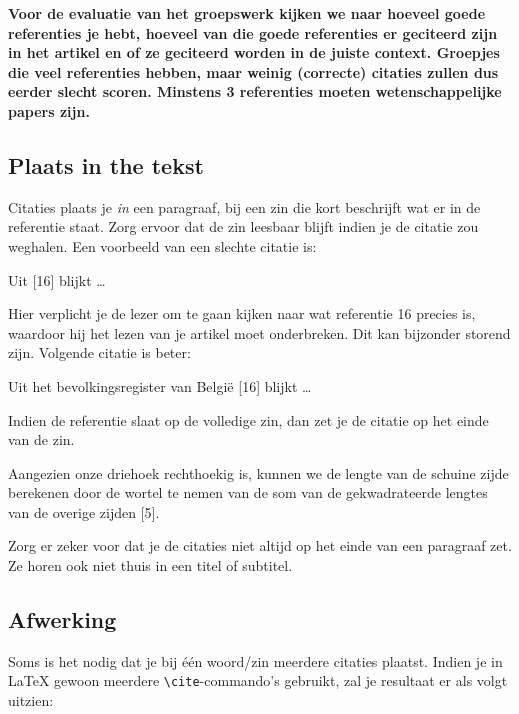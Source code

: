 \documentclass[a4paper]{article}
\begin{document}
\textbf{Voor de evaluatie van het groepswerk kijken we naar hoeveel goede referenties je hebt, hoeveel van die goede referenties er geciteerd zijn in het artikel en of ze geciteerd worden in de juiste context.
Groepjes die veel referenties hebben, maar weinig (correcte) citaties zullen dus eerder slecht scoren.
Minstens 3 referenties moeten wetenschappelijke papers zijn.}


\subsection{Plaats in the tekst}

Citaties plaats je \emph{in} een paragraaf, bij een zin die kort beschrijft wat er in de referentie staat.
Zorg ervoor dat de zin leesbaar blijft indien je de citatie zou weghalen.
Een voorbeeld van een slechte citatie is:

\begin{displayquote}
{\color{red} Uit [16] blijkt \ldots}
\end{displayquote}

Hier verplicht je de lezer om te gaan kijken naar wat referentie 16 precies is, waardoor hij het lezen van je artikel moet onderbreken.
Dit kan bijzonder storend zijn.
Volgende citatie is beter:

\begin{displayquote}
{\color{darkgreen} Uit het bevolkingsregister van Belgi\"e [16] blijkt \ldots}
\end{displayquote}

Indien de referentie slaat op de volledige zin, dan zet je de citatie op het einde van de zin.

\begin{displayquote}
{\color{darkgreen} Aangezien onze driehoek rechthoekig is, kunnen we de lengte van de schuine zijde berekenen door de wortel te nemen van de som van de gekwadrateerde lengtes van de overige zijden [5].}
\end{displayquote}

Zorg er zeker voor dat je de citaties niet altijd op het einde van een paragraaf zet.
Ze horen ook niet thuis in een titel of subtitel.


\subsection{Afwerking}

Soms is het nodig dat je bij \'e\'en woord/zin meerdere citaties plaatst.
Indien je in \LaTeX{} gewoon meerdere \texttt{\textbackslash{}cite}-commando's gebruikt, zal je resultaat er als volgt uitzien:
\end{document}
